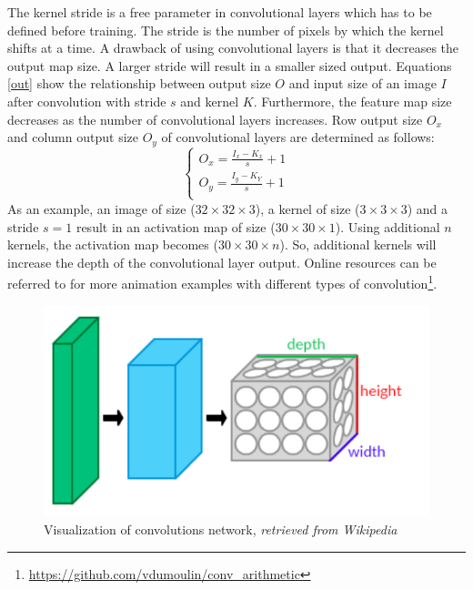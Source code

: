     The kernel stride is a free parameter in convolutional layers which has to be defined before training. The stride is the number of pixels by which the kernel shifts at a time. A drawback of using convolutional layers is that it decreases the output map size. A larger stride will result in a smaller sized output. Equations \ref{out} show the relationship between output size $O$ and input size of an image $I$ after convolution with stride $s$ and kernel $K$. Furthermore, the feature map size decreases as the number of convolutional layers increases. Row output size $O_x$ and column output size $O_y$ of convolutional layers are determined as follows:
    \begin{equation}
        \begin{cases}
            O_x = \frac{I_x-K_x}{s} + 1 \\
            O_y = \frac{I_y - K_Y}{s} + 1 \\
        \end{cases}
        \label{out}
    \end{equation}
    As an example, an image of size ($32\times 32 \times 3$), a kernel of size ($3\times 3\times 3$) and a stride $s=1$ result in an activation map of size ($30 \times 30 \times 1$). Using additional $n$ kernels, the activation map becomes ($30\times30\times n$). So, additional kernels will increase the depth of the convolutional layer output. Online resources can be referred to for more animation examples with different types of convolution\footnote{\url{https://github.com/vdumoulin/conv_arithmetic}}.\\

    \begin{figure}[!h]
        \centering
        \includegraphics[scale = 0.3]{Figures/Conv_layers.png}
        \caption{Visualization of convolutions network, \textit{retrieved from Wikipedia}}
    \end{figure}


